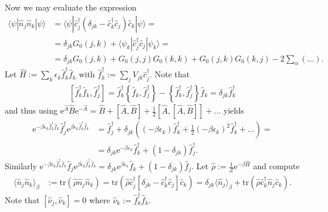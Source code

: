 \documentclass[english, parskip=full]{scrartcl}
\renewcommand{\bra}{}
\renewcommand{\braket}{}
\newcommand{\kla}{}
\newcommand{\klam}{}
\newcommand{\klammer}{}
\newcommand{\tecxt}{}
\newcommand{\e}{\text{e}}
\begin{document}
Now we may evaluate the expression
\begin{align}
\braket\langle \psi | \hat{n}_j\hat{n}_k | \psi \rangle &= \braket\langle \psi | \hat{c}_j^\dagger \kla\left( \delta_{jk} - \hat{c}_k^\dagger \hat{c}_j \right) \hat{c}_k | \psi \rangle = \\
&= \delta_{jk} G_0(j,k) + \braket\langle \psi_k | \hat{c}_j^\dagger \hat{c}_j | \psi_k \rangle = \\
&= \delta_{jk} G_0(j,k) + G_0(j,j)G_0(k,k) + G_0(j,k)G_0(k,j) - 2\sum_\alpha (\dots).
\end{align}
Let $\hat{H} := \sum_k\epsilon_k \hat{f}_k^\dagger \hat{f}_k$ with $\hat{f}_k^\dagger := \sum_j V_{jk} \hat{c}_j^\dagger$.
Note that 
\begin{align}
\left[ \hat{f}_k^\dagger \hat{f}_k, \hat{f}_j^\dagger \right] = \hat{f}_k^\dagger \klammer\left\{ \hat{f}_k, \hat{f}_j^\dagger \right\} - \klammer\left\{ \hat{f}_k^\dagger, \hat{f}_j^\dagger \right\} \hat{f}_k = \delta_{jk} \hat{f}_k^\dagger
\end{align}
and thus using $\e^{\hat{A}} \hat{B} \e^{-\hat{A}} = \hat{B} + \klam\left[ \hat{A}, \hat{B} \right] + \frac{1}{2} \klam\left[ \hat{A}, \klam\left[ \hat{A}, \hat{B} \right] \right] + \dots$ yields
\begin{align}
\e^{-\beta\epsilon_k\hat{f}_k^\dagger \hat{f}_k} \hat{f}_j^\dagger \e^{\beta\epsilon_k\hat{f}_k^\dagger \hat{f}_k} &= \hat{f}_j^\dagger + \delta_{jk} \kla\left( (-\beta\epsilon_k) \hat{f}_k^\dagger + \frac{1}{2} (-\beta\epsilon_k)^2 \hat{f}_k^\dagger + \dots \right) = \\
&= \delta_{jk} \e^{-\beta\epsilon_k} \hat{f}_k^\dagger + (1 - \delta_{jk}) \hat{f}_j^\dagger.
\end{align}
Similarly $\e^{-\beta\epsilon_k\hat{f}_k^\dagger \hat{f}_k} \hat{f}_j \e^{\beta\epsilon_k\hat{f}_k^\dagger \hat{f}_k} = \delta_{jk} \e^{\beta\epsilon_k} \hat{f}_k + (1 - \delta_{jk}) \hat{f}_j$.
Let $\hat{\rho} := \frac{1}{Z} \e^{-\beta\hat{H}}$ and compute
\begin{align}
\bra\langle \hat{n}_j\hat{n}_k \rangle_\beta &:= \tecxt\text{tr} \kla\left( \hat{\rho} \hat{n}_j\hat{n}_k \right) = \tecxt\text{tr} \kla\left( \hat{\rho} \hat{c}_j^\dagger \klam\left[ \delta_{jk} - \hat{c}_k^\dagger \hat{c}_j \right] \hat{c}_k \right) = \delta_{jk} \bra\langle \hat{n}_j \rangle_\beta + \tecxt\text{tr} \kla\left( \hat{\rho} \hat{c}_k^\dagger \hat{n}_j \hat{c}_k \right).
\end{align}
Note that $\klam\left[ \hat{\nu}_j, \hat{\nu}_k \right] = 0$ where $\hat{\nu}_k := \hat{f}_k^\dagger \hat{f}_k$.
\end{document}
